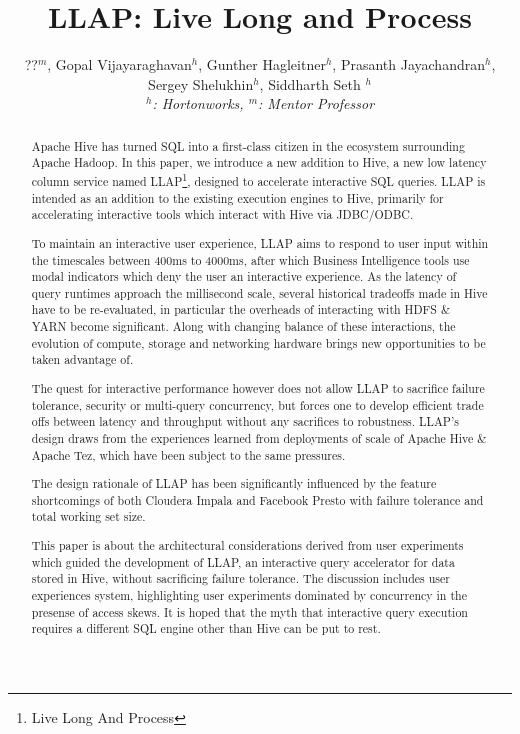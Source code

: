\documentclass{vldb}
\begin{document}
\title{LLAP: Live Long and Process}

\author{
\alignauthor
??$^m$, Gopal Vijayaraghavan$^h$, Gunther Hagleitner$^h$, Prasanth Jayachandran$^h$, \\ 
Sergey Shelukhin$^h$, Siddharth Seth $^h$
\\
{\large \emph{$^h$: Hortonworks, $^m$: Mentor Professor}}
}

\maketitle

\begin{abstract}
Apache Hive has turned SQL into a first-class citizen in the ecosystem surrounding Apache Hadoop.
In this paper, we introduce a new addition to Hive, a new low latency column service named
LLAP\footnote{Live Long And Process}, designed to accelerate interactive SQL queries. LLAP is intended 
as an addition to the existing execution engines to Hive, primarily for accelerating interactive
tools which interact with  Hive via JDBC/ODBC.

To maintain an interactive user experience, LLAP aims to respond to user input within the timescales
between 400ms to 4000ms, after which Business Intelligence tools use modal indicators which deny the 
user an interactive experience. As the latency of query runtimes approach the millisecond scale, 
several historical tradeoffs made in Hive have to be re-evaluated, in particular the overheads of
interacting with HDFS \& YARN become significant. Along with changing balance of these interactions, 
the evolution of compute, storage and networking hardware brings new opportunities to be taken
advantage of.

The quest for interactive performance however does not allow LLAP to sacrifice failure tolerance,
security or multi-query concurrency, but forces one to develop efficient trade offs between latency and 
throughput without any sacrifices to robustness. LLAP's design draws from the experiences learned
from deployments of scale of Apache Hive \& Apache Tez, which have been subject to the same pressures.

The design rationale of LLAP has been significantly influenced by the feature shortcomings of both 
Cloudera Impala\cite{impala} and Facebook Presto\cite{presto} with failure tolerance and total working
set size.

This paper is about the architectural considerations derived from user experiments which guided the 
development of LLAP, an interactive query accelerator for data stored in Hive, without sacrificing 
failure tolerance. The discussion includes user experiences  
system, highlighting user experiments dominated by concurrency in the presense of access skews. It is 
hoped that the myth that interactive query execution requires a different SQL engine other than Hive 
can be put to rest.

\end{abstract}
\end{document}
